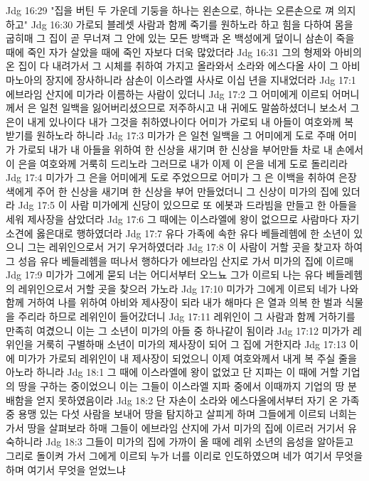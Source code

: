 Jdg 16:29  "집을 버틴 두 가운데 기둥을 하나는 왼손으로, 하나는 오른손으로 껴 의지하고"
Jdg 16:30  가로되 블레셋 사람과 함께 죽기를 원하노라 하고 힘을 다하여 몸을 굽히매 그 집이 곧 무너져 그 안에 있는 모든 방백과 온 백성에게 덮이니 삼손이 죽을 때에 죽인 자가 살았을 때에 죽인 자보다 더욱 많았더라
Jdg 16:31  그의 형제와 아비의 온 집이 다 내려가서 그 시체를 취하여 가지고 올라와서 소라와 에스다올 사이 그 아비 마노아의 장지에 장사하니라 삼손이 이스라엘 사사로 이십 년을 지내었더라
Jdg 17:1  에브라임 산지에 미가라 이름하는 사람이 있더니
Jdg 17:2  그 어미에게 이르되 어머니께서 은 일천 일백을 잃어버리셨으므로 저주하시고 내 귀에도 말씀하셨더니 보소서 그 은이 내게 있나이다 내가 그것을 취하였나이다 어미가 가로되 내 아들이 여호와께 복 받기를 원하노라 하니라
Jdg 17:3  미가가 은 일천 일백을 그 어미에게 도로 주매 어미가 가로되 내가 내 아들을 위하여 한 신상을 새기며 한 신상을 부어만들 차로 내 손에서 이 은을 여호와께 거룩히 드리노라 그러므로 내가 이제 이 은을 네게 도로 돌리리라
Jdg 17:4  미가가 그 은을 어미에게 도로 주었으므로 어미가 그 은 이백을 취하여 은장색에게 주어 한 신상을 새기며 한 신상을 부어 만들었더니 그 신상이 미가의 집에 있더라
Jdg 17:5  이 사람 미가에게 신당이 있으므로 또 에봇과 드라빔을 만들고 한 아들을 세워 제사장을 삼았더라
Jdg 17:6  그 때에는 이스라엘에 왕이 없으므로 사람마다 자기 소견에 옳은대로 행하였더라
Jdg 17:7  유다 가족에 속한 유다 베들레헴에 한 소년이 있으니 그는 레위인으로서 거기 우거하였더라
Jdg 17:8  이 사람이 거할 곳을 찾고자 하여 그 성읍 유다 베들레헴을 떠나서 행하다가 에브라임 산지로 가서 미가의 집에 이르매
Jdg 17:9  미가가 그에게 묻되 너는 어디서부터 오느뇨 그가 이르되 나는 유다 베들레헴의 레위인으로서 거할 곳을 찾으러 가노라
Jdg 17:10  미가가 그에게 이르되 네가 나와 함께 거하여 나를 위하여 아비와 제사장이 되라 내가 해마다 은 열과 의복 한 벌과 식물을 주리라 하므로 레위인이 들어갔더니
Jdg 17:11  레위인이 그 사람과 함께 거하기를 만족히 여겼으니 이는 그 소년이 미가의 아들 중 하나같이 됨이라
Jdg 17:12  미가가 레위인을 거룩히 구별하매 소년이 미가의 제사장이 되어 그 집에 거한지라
Jdg 17:13  이에 미가가 가로되 레위인이 내 제사장이 되었으니 이제 여호와께서 내게 복 주실 줄을 아노라 하니라
Jdg 18:1  그 때에 이스라엘에 왕이 없었고 단 지파는 이 때에 거할 기업의 땅을 구하는 중이었으니 이는 그들이 이스라엘 지파 중에서 이때까지 기업의 땅 분배함을 얻지 못하였음이라
Jdg 18:2  단 자손이 소라와 에스다올에서부터 자기 온 가족중 용맹 있는 다섯 사람을 보내어 땅을 탐지하고 살피게 하며 그들에게 이르되 너희는 가서 땅을 살펴보라 하매 그들이 에브라임 산지에 가서 미가의 집에 이르러 거기서 유숙하니라
Jdg 18:3  그들이 미가의 집에 가까이 올 때에 레위 소년의 음성을 알아듣고 그리로 돌이켜 가서 그에게 이르되 누가 너를 이리로 인도하였으며 네가 여기서 무엇을 하며 여기서 무엇을 얻었느냐
